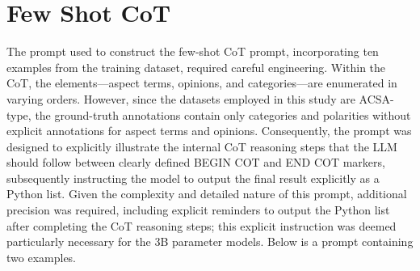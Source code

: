 \documentclass[11pt]{article}
\begin{document}
\begin{adjustbox}{width=\columnwidth}
\begin{tcolorbox}[colframe=black, colback=gray!10, width=3.5in, title=CoT Multi-Hop Thread]
\end{tcolorbox}
\end{adjustbox}

\section{Few Shot CoT}
\label{sec:appendix:few_shot_cot}

The prompt used to construct the few-shot CoT prompt, incorporating ten examples from the training dataset, required careful engineering. Within the CoT, the elements—aspect terms, opinions, and categories—are enumerated in varying orders. However, since the datasets employed in this study are ACSA-type, the ground-truth annotations contain only categories and polarities without explicit annotations for aspect terms and opinions. Consequently, the prompt was designed to explicitly illustrate the internal CoT reasoning steps that the LLM should follow between clearly defined BEGIN COT and END COT markers, subsequently instructing the model to output the final result explicitly as a Python list. Given the complexity and detailed nature of this prompt, additional precision was required, including explicit reminders to output the Python list after completing the CoT reasoning steps; this explicit instruction was deemed particularly necessary for the 3B parameter models. Below is a prompt containing two examples.
\end{document}
